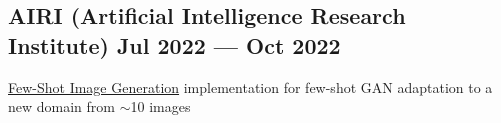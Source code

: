 \subsection{AIRI (Artificial Intelligence Research Institute) \hfill Jul 2022 --- Oct 2022}
\begin{zitemize}
\item \href{https://arxiv.org/abs/2104.06820}{Few-Shot Image Generation} implementation for few-shot GAN adaptation to a new domain from $\sim$10 images
\end{zitemize}
